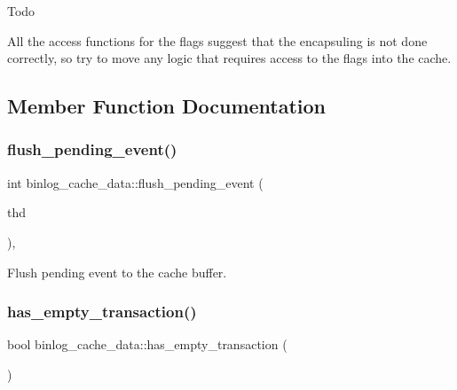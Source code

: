 \begin{DoxyRefDesc}{Todo}
\item[\mbox{\hyperlink{todo__todo000003}{Todo}}]All the access functions for the flags suggest that the encapsuling is not done correctly, so try to move any logic that requires access to the flags into the cache. \end{DoxyRefDesc}


\subsection{Member Function Documentation}
\mbox{\label{classbinlog__cache__data_a37719832e76451067746218d282b7e2b}} 
\subsubsection{\texorpdfstring{flush\+\_\+pending\+\_\+event()}{flush\_pending\_event()}}
{\footnotesize\ttfamily int binlog\+\_\+cache\+\_\+data\+::flush\+\_\+pending\+\_\+event (\begin{DoxyParamCaption}\item[{T\+HD $\ast$}]{thd }\end{DoxyParamCaption})\hspace{0.3cm}{\ttfamily [inline]}, {\ttfamily [protected]}}

Flush pending event to the cache buffer. \mbox{\label{classbinlog__cache__data_a335439d52a5ef045b96597ffb377c6b4}} 
\subsubsection{\texorpdfstring{has\+\_\+empty\+\_\+transaction()}{has\_empty\_transaction()}}
{\footnotesize\ttfamily bool binlog\+\_\+cache\+\_\+data\+::has\+\_\+empty\+\_\+transaction (\begin{DoxyParamCaption}{ }\end{DoxyParamCaption})\hspace{0.3cm}{\ttfamily [inline]}}

